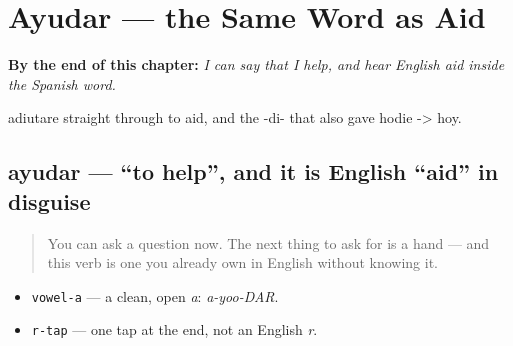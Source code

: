 
\chapter{Ayudar — the Same Word as Aid}
\label{ch:spanish-ayudar}

\begin{chapteropening}
\textbf{By the end of this chapter:} \emph{I can say that I help, and hear English aid inside the Spanish word.}

adiutare straight through to aid, and the -di- that also gave hodie -> hoy.
\end{chapteropening}

\section[ayudar]{ayudar — \textquotedblleft{}to help\textquotedblright{}, and it is English \textquotedblleft{}aid\textquotedblright{} in disguise}

\label{lesson:ES-C35-ayudar}



\begin{quote}
You can ask a question now. The next thing to ask for is a hand — and this verb is one you already own in English without knowing it.
\end{quote}

\begin{sounds}
\begin{itemize}
\raggedright
  \item \texttt{vowel-a} — a clean, open \emph{a}: \emph{a-yoo-DAR}.
  \item \texttt{r-tap} — one tap at the end, not an English \emph{r}.
\end{itemize}
\end{sounds}

